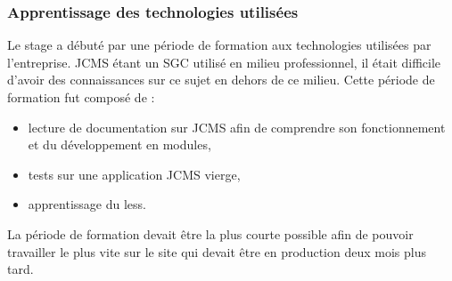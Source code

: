 \documentclass[12pt,a4paper]{article}
\begin{document}
\subsubsection{Apprentissage des technologies utilisées}
Le stage a débuté par une période de formation aux technologies utilisées par l'entreprise. \gls{JCMS} étant un SGC utilisé en milieu professionnel, il était difficile d'avoir des connaissances sur ce sujet en dehors de ce milieu. Cette période de formation fut composé de :
\begin{itemize}
\item lecture de documentation sur \gls{JCMS} afin de comprendre son fonctionnement et du développement en modules,
\item tests sur une application \gls{JCMS} vierge,
\item apprentissage du less.
\end{itemize} 
La période de formation devait être la plus courte possible afin de pouvoir travailler le plus vite sur le site qui devait être en production deux mois plus tard. \par
\end{document}
